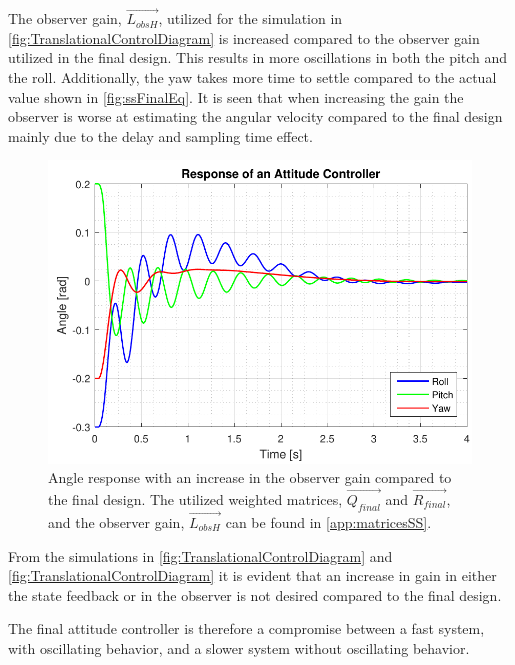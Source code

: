 The observer gain, $\vec{L_{obsH}}$, utilized for the simulation in  \autoref{fig:TranslationalControlDiagram} is increased compared to the observer gain utilized in the final design. This results in more oscillations in both the pitch and the roll. Additionally, the yaw takes more time to settle compared to the actual value shown in \autoref{fig:ssFinalEq}. It is seen that when increasing the gain the observer is worse at estimating the angular velocity compared to the final design mainly due to the delay and sampling time effect.
%
\begin{figure}[H]
	\centering
	\includegraphics[scale=0.8]{figures/ssEqObsHigh.pdf}
	\caption{Angle response with an increase in the observer gain compared to the final design. The utilized weighted matrices, $\vec{Q_{final}}$ and $\vec{R_{final}}$, and the observer gain, $\vec{L_{obsH}}$ can be found in \autoref{app:matricesSS}.}
	\label{fig:TranslationalControlDiagram}
\end{figure}
%
From the simulations in \autoref{fig:TranslationalControlDiagram} and \autoref{fig:TranslationalControlDiagram} it is evident that an increase in gain in either the state feedback or in the observer is not desired compared to the final design.

The final attitude controller is therefore a compromise between a fast system, with oscillating behavior, and a slower system without oscillating behavior.


